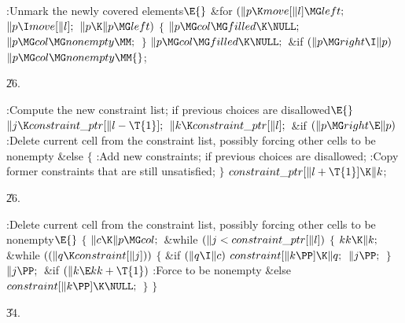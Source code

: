 \B{}:Unmark the newly covered elements\X${}\E{}$\6
\&{for} ${}(\|p\K\\{move}[\|l]\MG\\{left};{}$ ${}\|p\I\\{move}[\|l];{}$ ${}\|p%
\K\|p\MG\\{left}){}$\5
${}\{{}$\1\6
${}\|p\MG\\{col}\MG\\{filled}\K\NULL;{}$\6
${}\|p\MG\\{col}\MG\\{nonempty}\MM;{}$\6
\4${}\}{}$\2\6
${}\|p\MG\\{col}\MG\\{filled}\K\NULL;{}$\6
\&{if} ${}(\|p\MG\\{right}\I\|p){}$\1\5
${}\|p\MG\\{col}\MG\\{nonempty}\MM{}$;\2\par
\U26.\fi

\B{}:Compute the new constraint list;  if
previous choices are disallowed\X${}\E{}$\6
$\|j\K\\{constraint\_ptr}[\|l-\T{1}];{}$\6
${}\|k\K\\{constraint\_ptr}[\|l];{}$\6
\&{if} ${}(\|p\MG\\{right}\E\|p){}$\1\5
:Delete current cell from the constraint list, possibly forcing other cells
to be nonempty\X\2\6
\&{else}\5
${}\{{}$\1\6
:Add new constraints;  if previous choices are
disallowed\X;\6
:Copy former constraints that are still unsatisfied\X;\6
\4${}\}{}$\2\6
${}\\{constraint\_ptr}[\|l+\T{1}]\K\|k{}$;\par
\U26.\fi

\B{}:Delete current cell from the constraint list, possibly forcing
other cells to be nonempty\X${}\E{}$\6
${}\{{}$\1\6
${}\|c\K\|p\MG\\{col};{}$\6
\&{while} ${}(\|j<\\{constraint\_ptr}[\|l]){}$\5
${}\{{}$\1\6
${}\\{kk}\K\|k;{}$\6
\&{while} ${}((\|q\K\\{constraint}[\|j])){}$\5
${}\{{}$\1\6
\&{if} ${}(\|q\I\|c){}$\1\5
${}\\{constraint}[\|k\PP]\K\|q;{}$\2\6
${}\|j\PP;{}$\6
\4${}\}{}$\2\6
${}\|j\PP;{}$\6
\&{if} ${}(\|k\E\\{kk}+\T{1}){}$\1\5
:Force  to be nonempty\X\2\6
\&{else}\1\5
${}\\{constraint}[\|k\PP]\K\NULL;{}$\2\6
\4${}\}{}$\2\6
\4${}\}{}$\2\par
\U34.\fi

